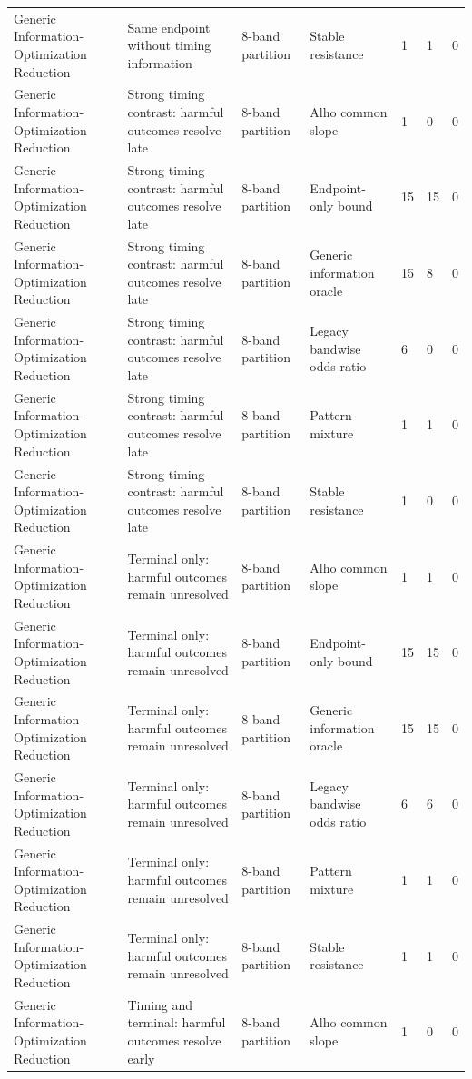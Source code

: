 \begin{tabular}{lllllll}
Generic Information-Optimization Reduction & Same endpoint without timing information & 8-band partition & Stable resistance & 1 & 1 & 0 \\
Generic Information-Optimization Reduction & Strong timing contrast: harmful outcomes resolve late & 8-band partition & Alho common slope & 1 & 0 & 0 \\
Generic Information-Optimization Reduction & Strong timing contrast: harmful outcomes resolve late & 8-band partition & Endpoint-only bound & 15 & 15 & 0 \\
Generic Information-Optimization Reduction & Strong timing contrast: harmful outcomes resolve late & 8-band partition & Generic information oracle & 15 & 8 & 0 \\
Generic Information-Optimization Reduction & Strong timing contrast: harmful outcomes resolve late & 8-band partition & Legacy bandwise odds ratio & 6 & 0 & 0 \\
Generic Information-Optimization Reduction & Strong timing contrast: harmful outcomes resolve late & 8-band partition & Pattern mixture & 1 & 1 & 0 \\
Generic Information-Optimization Reduction & Strong timing contrast: harmful outcomes resolve late & 8-band partition & Stable resistance & 1 & 0 & 0 \\
Generic Information-Optimization Reduction & Terminal only: harmful outcomes remain unresolved & 8-band partition & Alho common slope & 1 & 1 & 0 \\
Generic Information-Optimization Reduction & Terminal only: harmful outcomes remain unresolved & 8-band partition & Endpoint-only bound & 15 & 15 & 0 \\
Generic Information-Optimization Reduction & Terminal only: harmful outcomes remain unresolved & 8-band partition & Generic information oracle & 15 & 15 & 0 \\
Generic Information-Optimization Reduction & Terminal only: harmful outcomes remain unresolved & 8-band partition & Legacy bandwise odds ratio & 6 & 6 & 0 \\
Generic Information-Optimization Reduction & Terminal only: harmful outcomes remain unresolved & 8-band partition & Pattern mixture & 1 & 1 & 0 \\
Generic Information-Optimization Reduction & Terminal only: harmful outcomes remain unresolved & 8-band partition & Stable resistance & 1 & 1 & 0 \\
Generic Information-Optimization Reduction & Timing and terminal: harmful outcomes resolve early & 8-band partition & Alho common slope & 1 & 0 & 0 \\

\end{tabular}
